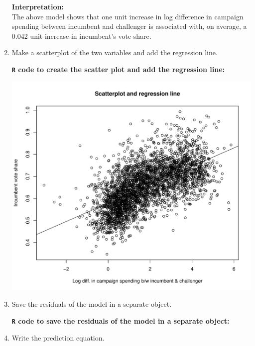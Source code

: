 \documentclass[12pt,letterpaper]{article}
\begin{document}
\begin{enumerate}
		\textbf{Interpretation:}\\
		The above model shows that one unit increase in log difference in campaign spending between incumbent and challenger is associated with, on average, a 0.042 unit increase in incumbent's vote share.

\pagebreak

		\item Make a scatterplot of the two variables and add the regression line. 	
		
		\textbf{\texttt{R} code to create the scatter plot and add the regression line:}
		  
		
		\begin{center}
			\includegraphics[width=15cm]{plot1.pdf}  
		\end{center}
		
		\item Save the residuals of the model in a separate object.
		
		\textbf{\texttt{R} code to save the residuals of the model in a separate object:}
		
		
		\item Write the prediction equation.
		

\end{enumerate}
\end{document}

